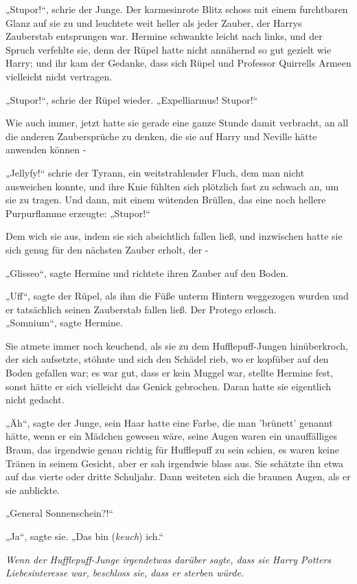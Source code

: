{„Stupor!“, schrie der Junge. Der karmesinrote Blitz schoss mit einem furchtbaren Glanz auf sie zu und leuchtete weit heller als jeder Zauber, der Harrys Zauberstab entsprungen war. Hermine schwankte leicht nach links, und der Spruch verfehlte sie, denn der Rüpel hatte nicht annähernd so gut gezielt wie Harry; und ihr kam der Gedanke, dass sich Rüpel und Professor Quirrells Armeen vielleicht nicht vertragen.

„Stupor!“, schrie der Rüpel wieder. „Expelliarmus! Stupor!“

Wie auch immer, jetzt hatte sie gerade eine ganze Stunde damit verbracht, an all die anderen Zaubersprüche zu denken, die sie auf Harry und Neville hätte anwenden können -

„Jellyfy!“ schrie der Tyrann, ein weitstrahlender Fluch, dem man nicht ausweichen konnte, und ihre Knie fühlten sich plötzlich fast zu schwach an, um sie zu tragen. Und dann, mit einem wütenden Brüllen, das eine noch hellere Purpurflamme erzeugte: „Stupor!“

Dem wich sie aus, indem sie sich absichtlich fallen ließ, und inzwischen hatte sie sich genug für den nächsten Zauber erholt, der -

„Glisseo“, sagte Hermine und richtete ihren Zauber auf den Boden.

„Uff“, sagte der Rüpel, als ihm die Füße unterm Hintern weggezogen wurden und er tatsächlich seinen Zauberstab fallen ließ. Der Protego erlosch.\\ „Somnium“, sagte Hermine.

Sie atmete immer noch keuchend, als sie zu dem Hufflepuff-Jungen hinüberkroch, der sich aufsetzte, stöhnte und sich den Schädel rieb, wo er kopfüber auf den Boden gefallen war; es war gut, dass er kein Muggel war, stellte Hermine fest, sonst hätte er sich vielleicht das Genick gebrochen. Daran hatte sie eigentlich nicht gedacht.

„Äh“, sagte der Junge, sein Haar hatte eine Farbe, die man 'brünett' genannt hätte, wenn er ein Mädchen gewesen wäre, seine Augen waren ein unauffälliges Braun, das irgendwie genau richtig für Hufflepuff zu sein schien, es waren keine Tränen in seinem Gesicht, aber er sah irgendwie blass aus. Sie schätzte ihn etwa auf das vierte oder dritte Schuljahr. Dann weiteten sich die braunen Augen, als er sie anblickte.

„General Sonnenschein?!“

„Ja“, sagte sie. „Das bin (\emph{keuch}) ich.“

\emph{Wenn der Hufflepuff-Junge irgendetwas darüber sagte, dass sie Harry Potters Liebesinteresse war, beschloss sie, dass er sterben würde.}

}
